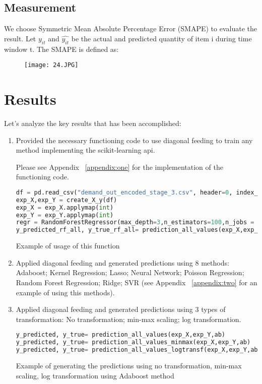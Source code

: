 \documentclass{article}
\begin{document}
\subsection{Measurement}
We choose Symmetric Mean Absolute Percentage Error (SMAPE) to evaluate the result.
Let $y_{it}$ and $\hat{y_{it}}$ be the actual and predicted quantity of item i during time window t. The SMAPE is defined as:
\begin{figure}[H]
\texttt{[image: 24.JPG]}
\centering
\end{figure}

\section{Results}
Let's analyze the key results that has been accomplished:
\begin{enumerate}  
\item Provided the necessary functioning code to use diagonal feeding to train any method implementing the scikit-learning api. 

Please see Appendix ~\ref{appendix:one} for the implementation of the functioning code.

\begin{lstlisting}[language =Python, breaklines=True]  
df = pd.read_csv("demand_out_encoded_stage_3.csv", header=0, index_col=None)
exp_X,exp_Y = create_X_y(df)
exp_X = exp_X.applymap(int)
exp_Y = exp_Y.applymap(int)
regr = RandomForestRegressor(max_depth=3,n_estimators=100,n_jobs = -1)
y_predicted_rf_all, y_true_rf_all= prediction_all_values(exp_X,exp_Y,regr)
\end{lstlisting}
Example of usage of this function


\item Applied diagonal feeding and generated predictions using 8 methods: Adaboost; Kernel Regression; Lasso; Neural Network; Poisson Regression; Random Forest Regression; Ridge; SVR (see Appendix ~\ref{appendix:two} for an example of using this methods).

\item Applied diagonal feeding and generated predictions using 3 types of transformation: No transformation; min-max scaling; log transformation.
\begin{lstlisting}[language =Python, breaklines=True]
y_predicted, y_true= prediction_all_values(exp_X,exp_Y,ab)
y_predicted, y_true= prediction_all_values_minmax(exp_X,exp_Y,ab)
y_predicted, y_true= prediction_all_values_logtransf(exp_X,exp_Y,ab)
\end{lstlisting}
Example of generating the predictions using no transformation, min-max scaling, log transformation using Adaboost method



\end{enumerate}
\end{document}
